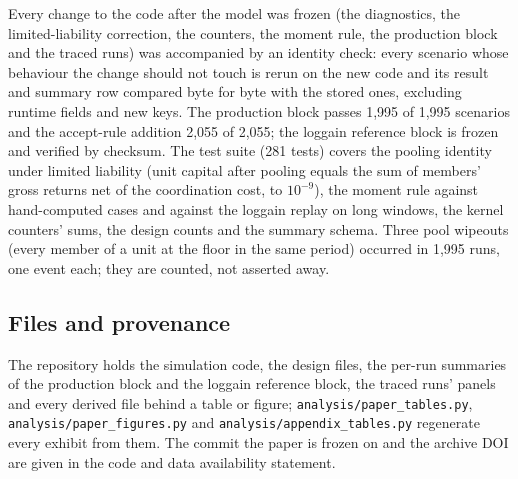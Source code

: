 Every change to the code after the model was frozen (the diagnostics, the limited-liability correction, the counters, the moment rule, the production block and the traced runs) was accompanied by an identity check: every scenario whose behaviour the change should not touch is rerun on the new code and its result and summary row compared byte for byte with the stored ones, excluding runtime fields and new keys. The production block passes 1,995 of 1,995 scenarios and the accept-rule addition 2,055 of 2,055; the loggain reference block is frozen and verified by checksum. The test suite (281 tests) covers the pooling identity under limited liability (unit capital after pooling equals the sum of members' gross returns net of the coordination cost, to $10^{-9}$), the moment rule against hand-computed cases and against the loggain replay on long windows, the kernel counters' sums, the design counts and the summary schema. Three pool wipeouts (every member of a unit at the floor in the same period) occurred in 1,995 runs, one event each; they are counted, not asserted away.

\subsection{Files and provenance}\label{app:files}

The repository holds the simulation code, the design files, the per-run summaries of the production block and the loggain reference block, the traced runs' panels and every derived file behind a table or figure; \texttt{analysis/paper\_tables.py}, \texttt{analysis/paper\_figures.py} and \texttt{analysis/appendix\_tables.py} regenerate every exhibit from them. The commit the paper is frozen on and the archive DOI are given in the code and data availability statement.
